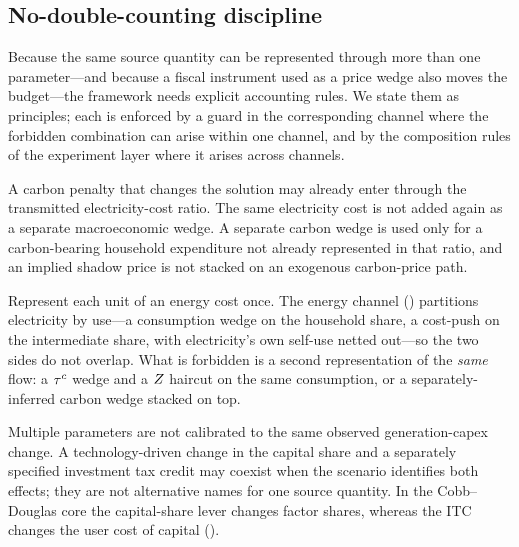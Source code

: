 \subsection{No-double-counting discipline}
\label{sec:discipline}

Because the same source quantity can be represented through more than one parameter---and because a
fiscal instrument used as a price wedge also moves the budget---the framework needs
explicit accounting rules. We state them as principles; each is enforced by a guard in
the corresponding channel where the forbidden combination can arise within one channel,
and by the composition rules of the experiment layer where it arises across channels.

\begin{principle}
A carbon penalty that changes the \CLEWS{} solution may already enter \OGCore{} through
the transmitted electricity-cost ratio. The same electricity cost is not added again as
a separate macroeconomic wedge. A separate \OGCore{} carbon wedge is used only for a
carbon-bearing household expenditure not already represented in that ratio, and an
implied shadow price is not stacked on an exogenous carbon-price path.
\end{principle}

\begin{principle}
Represent each unit of an energy cost once. The energy channel ()
partitions electricity by use---a consumption wedge on the household share, a cost-push
on the intermediate share, with electricity's own self-use netted out---so the two sides
do not overlap. What is forbidden is a second representation of the \emph{same} flow: a
$\tau^{c}$ wedge and a $Z$ haircut on the same consumption, or a separately-inferred
carbon wedge stacked on top.
\end{principle}

\begin{principle}
Multiple parameters are not calibrated to the same observed generation-capex change. A
technology-driven change in the capital share and a separately specified investment tax
credit may coexist when the scenario identifies both effects; they are not alternative
names for one source quantity. In the Cobb--Douglas core the capital-share lever changes
factor shares, whereas the ITC changes the user cost of capital
().
\end{principle}

